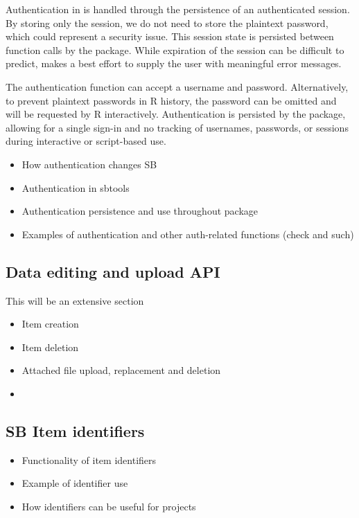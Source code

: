 Authentication in  is handled through the persistence of 
an authenticated session. By storing only the session, we do not need to 
store the plaintext password, which could represent a security issue. This
session state is persisted between function calls by the package. While  
expiration of the session can be difficult to predict, 
makes a best effort to supply the user with meaningful error messages.

The authentication function  can accept a username
and password. Alternatively, to prevent plaintext passwords in R history, 
the password can be omitted and will be requested by R interactively. 
Authentication is persisted by the package, allowing for a single sign-in
and no tracking of usernames, passwords, or sessions during interactive or
script-based use. 

\begin{example}



\end{example}

\begin{itemize}
	\item{How authentication changes SB}
	\item{Authentication in sbtools}
	\item{Authentication persistence and use throughout package}
	\item{Examples of authentication and other auth-related functions (check and such)}
\end{itemize}

\subsection{Data editing and upload API}
This will be an extensive section
\begin{itemize}
	\item{Item creation}
	\item{Item deletion}
	\item{Attached file upload, replacement and deletion}
	\item{}
\end{itemize}

\subsection{SB Item identifiers}
\begin{itemize}
	\item{Functionality of item identifiers}
	\item{Example of identifier use}
	\item{How identifiers can be useful for projects}
\end{itemize}
